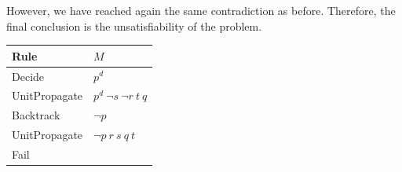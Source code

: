 \begin{example}
    However, we have reached again the same contradiction as before. Therefore, the final conclusion is the unsatisfiability of the problem. \vspace{7pt}
    \begin{center}
        \begin{tabular}{|p{2.75cm}|p{5cm}|}          
            \hline
                \textbf{Rule} & $M$\\ 
            \hline
                Decide & $p^d$ \\
            \hline
                UnitPropagate & $p^d\  \neg s \ \neg r \ t \ q$ \\
            \hline
                Backtrack & $\neg p$ \\
            \hline
                UnitPropagate & $\neg p \ r \ s \ q \ t $ \\
            \hline
                Fail & \\
            \hline
        \end{tabular}
    \end{center} \vspace{7pt}
\end{example}